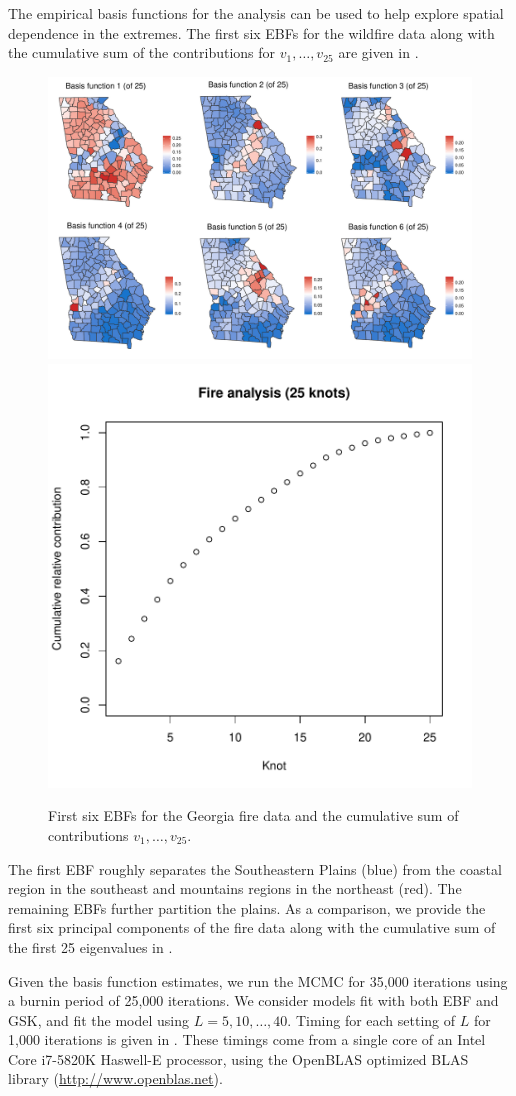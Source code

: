 \documentclass[11pt]{article}
\begin{document}
The empirical basis functions for the analysis can be used to help explore spatial dependence in the extremes.
The first six EBFs for the wildfire data along with the cumulative sum of the contributions for $v_1, \ldots, v_{25}$ are given in .
\begin{figure}[htbp] %
  \centering
  \includegraphics[width=\linewidth]{plots/fire-ebf-panel.pdf}\\
  \includegraphics[width=0.45\linewidth]{plots/firev-25.pdf}
  \caption{First six EBFs for the Georgia fire data and the cumulative sum of contributions $v_1, \ldots, v_{25}$.}
  \label{ebfig:fire-ebfpanel}
\end{figure}
The first EBF roughly separates the Southeastern Plains (blue) from the coastal region in the southeast and mountains regions in the northeast (red).
The remaining EBFs further partition the plains.
As a comparison, we provide the first six principal components of the fire data along with the cumulative sum of the first 25 eigenvalues in .

Given the basis function estimates, we run the MCMC for 35,000 iterations using a burnin period of 25,000 iterations.
We consider models fit with both EBF and GSK, and fit the model using $L = 5, 10, \ldots, 40$.
Timing for each setting of $L$ for 1,000 iterations is given in .
These timings come from a single core of an Intel Core i7-5820K Haswell-E processor, using the OpenBLAS optimized BLAS library (\url{http://www.openblas.net}).
\end{document}
